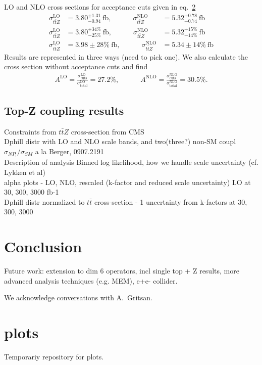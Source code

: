 \documentclass[preprint]{JHEP3} %
\newcommand{\be}{\begin{eqnarray}}
\newcommand{\ee}{\end{eqnarray}}
\newcommand{\ttb}{t \bar{t}}
\begin{document}
LO and NLO cross sections for acceptance cuts given in eq.~\ref{}
\be
  \sigma_{\ttb Z}^\mathrm{LO} &= 3.80^{+1.31}_{-0.94}~\mathrm{fb},
  \quad\quad\quad
  \sigma_{\ttb Z}^\mathrm{NLO} &= 5.32^{+0.78}_{-0.74}~\mathrm{fb}
\\
% 
  \sigma_{\ttb Z}^\mathrm{LO} &= 3.80^{+34\%}_{-25\%}~\mathrm{fb},
  \quad\quad\quad
  \sigma_{\ttb Z}^\mathrm{NLO} &= 5.32^{+15\%}_{-14\%}~\mathrm{fb}
\\
% 
  \sigma_{\ttb Z}^\mathrm{LO} &= 3.98 \pm 28\% ~\mathrm{fb},
  \quad\quad\quad
  \sigma_{\ttb Z}^\mathrm{NLO} &= 5.34 \pm 14 \%~\mathrm{fb}
\ee
Results are represented in three ways (need to pick one).
We also calculate the cross section without acceptance cuts and find
\be
  A^\mathrm{LO} = \frac{\sigma_{\mathrm{cuts}}^\mathrm{LO}}{\sigma_{\mathrm{total}}^\mathrm{LO}} = 27.2 \% ,
  \quad\quad\quad
  A^\mathrm{NLO} = \frac{\sigma_{\mathrm{cuts}}^\mathrm{NLO}}{\sigma_{\mathrm{total}}^\mathrm{NLO}} = 30.5 \%.
\ee

\subsection{Top-Z coupling results}
Constraints from $t\bar{t}Z$ cross-section from CMS \\
Dphill distr with LO and NLO scale bands, and two(three?) non-SM coupl\\
$\sigma_{NP|} / \sigma_{SM}$ a la Berger, 0907.2191 \\
Description of analysis Binned log likelihood, how we handle scale uncertainty (cf. Lykken et al) \\
alpha plots - LO, NLO, rescaled (k-factor and reduced scale uncertainty) LO at 30, 300, 3000 fb-1\\
Dphill distr normalized to $t\bar{t}$ cross-section  - 1 uncertainty from k-factors at 30, 300, 3000\\

\section{Conclusion}
Future work: extension to dim 6 operators, incl single top + Z results, more advanced analysis techniques (e.g. MEM), e+e- collider.
%


\acknowledgments
We acknowledge conversations with A.~Gritsan.



\appendix
\section{plots}
Temporariy repository for plots.
\end{document}
